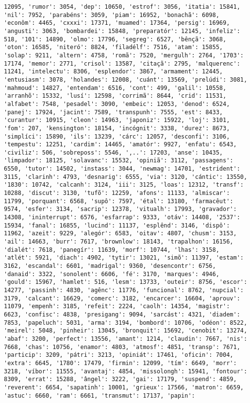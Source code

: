 \documentclass[11pt]{article}
\begin{document}
\begin{Verbatim}[commandchars=\\\{\}]
12095, 'rumor': 3054, 'dep': 10650, 'estrof': 3056, 'itatia': 15841, 'nil': 7952, 'parabéns': 3059, 'piam': 16952, 'bonachã': 6098, 'econôm': 4465, 'cxxxi': 17371, 'muamed': 17364, 'persig': 16969, 'angusti': 3063, 'bombardei': 15848, 'preparatór': 12145, 'infeliz': 518, '101': 14890, 'olmo': 17796, 'segreg': 6527, 'bênçã': 3068, 'oton': 16585, 'niteró': 8824, 'filadélf': 7516, 'atam': 15855, 'solap': 9211, 'altern': 4758, 'romã': 7520, 'mergulh': 2764, '1703': 17174, 'memor': 2771, 'crisol': 13587, 'citaçã': 2795, 'malquerenc': 11241, 'intelectu': 8306, 'esplendor': 3867, 'armament': 12445, 'entusiasm': 3078, 'holandes': 12008, 'cuánt': 13569, 'prelúdi': 3081, 'mahmoud': 14827, 'entendam': 6516, 'cont': 499, 'galil': 10558, 'arranhõ': 15332, 'lusí': 12598, 'corrimã': 8644, 'crid': 11531, 'alfabet': 7548, 'pesadel': 3090, 'embeic': 12053, 'denod': 6524, 'panej': 17924, 'jacint': 7589, 'transpunh': 7555, 'est': 8433, 'curantur': 10915, 'cleon': 14963, 'japoniz': 15922, 'loj': 3101, 'fom': 207, 'kensington': 18154, 'incógnit': 3338, 'durez': 8673, 'simplíci': 15890, 'ils': 13239, 'cárc': 12057, 'desconfi': 3106, 'tempestu': 12251, 'cardim': 14465, 'amatór': 9927, 'enfatu': 6543, 'civiliz': 506, 'sobreposs': 5546, ',..': 17203, 'anse': 10435, 'limpador': 18125, 'solavanc': 15532, 'opiniã': 3112, 'passagens': 6550, 'tutor': 14502, 'instass': 3044, 'newmag': 14701, 'estrident': 3115, 'clarinh': 4793, 'desnarig': 6555, 'via': 3120, 'cántic': 13550, '1830': 10742, 'calcanh': 3124, 'iii': 3125, 'loas': 12312, 'transf': 10288, 'discut': 3130, 'tufõ': 12259, 'afons': 11133, 'almiscar': 11799, 'porquant': 6568, 'supô': 7597, 'étal': 13180, 'farmacêut': 9574, 'esfer': 3134, 'sacrip': 12378, 'vitualh': 17993, 'gravador': 14308, 'ininterrupt': 6576, 'esfarrap': 9333, 'otáv': 14408, '2537': 15934, 'fanal': 16855, 'lucind': 11137, 'esplênd': 3146, 'dispô': 11962, 'azeit': 9229, 'alegór': 6583, 'oitav': 4807, 'chusm': 3153, 'ail': 14663, 'burr': 7617, 'brownlow': 18143, 'trapalhon': 16156, 'dialét': 7618, 'panegír': 11639, 'morf': 10744, 'lhas': 3158, 'atlét': 5921, 'diach': 4902, 'tytir': 13021, 'simõ': 11397, 'estam': 3162, 'escandal': 6601, 'madrigal': 9360, 'desencontr': 6756, 'danaid': 3322, 'sonolent': 6606, 'fé': 3170, 'marques': 4946, 'gould': 15967, 'hamlet': 516, 'lesm': 13733, 'outeir': 8756, 'escor': 14277, 'passinh': 4830, 'agênc': 11776, 'funcional': 8762, 'nupcial': 3179, 'calcant': 16629, 'comerc': 3182, 'encarcer': 16604, 'aprouv': 11079, 'empenh': 3185, 'refeit': 2224, 'caolh': 14354, 'magistr': 6623, 'confisc': 4838, 'presigang': 9094, 'sarcást': 4321, 'diadem': 7853, 'papeluch': 5031, 'arma': 3194, 'bombord': 10706, 'odéon': 8522, 'meirel': 5048, 'pinheir': 13045, 'bronquit': 15692, 'cenobit': 13274, 'abaf': 3200, 'perfect': 13556, 'amant': 1214, 'claudin': 7667, 'nis': 7668, 'chas': 10756, 'enamor': 4803, 'atmosf': 4851, 'transp': 7671, 'particip': 3209, 'pátri': 3213, 'opiniát': 17461, 'oficin': 7004, 'extra': 6645, '1780': 17479, 'firmin': 12099, 'tím': 6649, 'morr': 3218, 'víbor': 11555, 'avantaj': 4854, 'missolongh': 15941, 'fontour': 8309, 'errat': 15288, 'ângel': 3222, 'gai': 17179, 'suspend': 4859, 'reverent': 6654, 'sapatinh': 10001, 'grieux': 17566, 'matron': 6659, 'astuc': 6660, 'ram': 6661, 'transmut': 17137, 'papin': 
\end{Verbatim}
\end{document}
